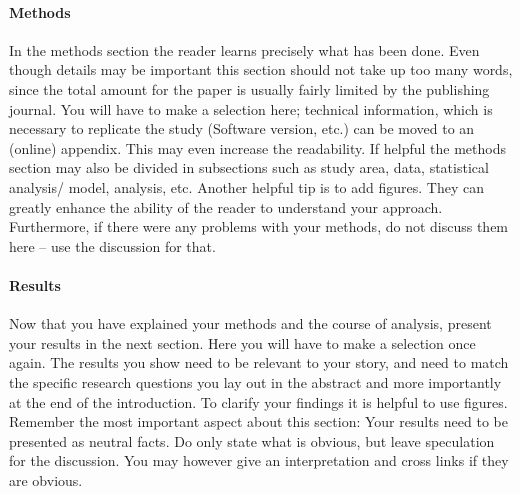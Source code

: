 \documentclass[justified, notoc]{tufte-book} %
\begin{document}
\paragraph{Methods}
In the methods section %
the reader learns precisely what has been done. Even though details may be important this section should not take up too many words, since the total amount for the paper is usually fairly limited by the publishing journal. You will have to make a selection here; technical information, which is necessary to replicate the study (Software version, etc.) can be moved to an (online) appendix. This may even increase the readability. If helpful the methods section may also be divided in subsections such as study area, data, statistical analysis/ model, analysis, etc. Another helpful tip is to add figures. They can greatly enhance the ability of the reader to understand your approach. Furthermore, if there were any problems with your methods, do not discuss them here -- use the discussion for that.\\

\paragraph{Results}
Now that you have explained your methods and the course of analysis, present your results in the next section.%
Here you will have to make a selection once again. The results you show need to be relevant to your story, and need to match the specific research questions you lay out in the abstract and more importantly at the end of the introduction. To clarify your findings it is helpful to use figures.
Remember the most important aspect about this section: Your results need to be presented as neutral facts. Do only state what is obvious, but leave speculation for the discussion. You may however give an interpretation and cross links if they are obvious.\\

\end{document}
